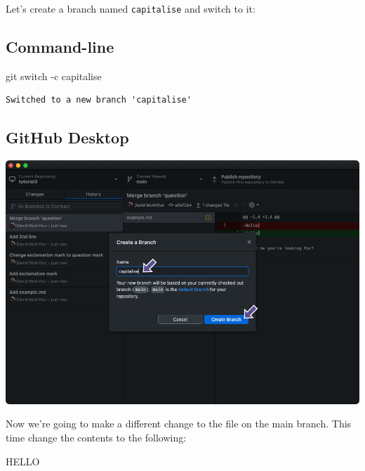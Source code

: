 \documentclass[
  letterpaper,
  DIV=11,
  numbers=noendperiod]{scrartcl}
\newenvironment{Shaded}{\begin{snugshade}}{\end{snugshade}}
\newcommand{\AttributeTok}[1]{\textcolor[rgb]{0.40,0.45,0.13}{#1}}
\newcommand{\FunctionTok}[1]{\textcolor[rgb]{0.28,0.35,0.67}{#1}}
\newcommand{\NormalTok}[1]{\textcolor[rgb]{0.00,0.23,0.31}{#1}}
\begin{document}
Let's create a branch named \texttt{capitalise} and switch to it:

\subsection{Command-line}

\begin{Shaded}
\begin{Highlighting}[]
\FunctionTok{git}\NormalTok{ switch }\AttributeTok{{-}c}\NormalTok{ capitalise}
\end{Highlighting}
\end{Shaded}

\begin{verbatim}
Switched to a new branch 'capitalise'
\end{verbatim}

\subsection{GitHub Desktop}

\includegraphics{images/image46_1.png}

Now we're going to make a different change to the file on the main
branch. This time change the contents to the following:

\begin{tcolorbox}[enhanced jigsaw, rightrule=.15mm, opacitybacktitle=0.6, bottomtitle=1mm, colbacktitle=quarto-callout-note-color!10!white, toprule=.15mm, title=\textcolor{quarto-callout-note-color}{\faInfo}\hspace{0.5em}{example.md}, toptitle=1mm, left=2mm, leftrule=.75mm, titlerule=0mm, bottomrule=.15mm, colframe=quarto-callout-note-color-frame, arc=.35mm, coltitle=black, breakable, colback=white, opacityback=0]

HELLO

\end{tcolorbox}
\end{document}
